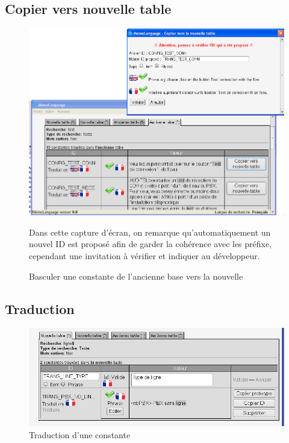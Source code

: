         \subsection{Copier vers nouvelle table}
    \begin{figure}[H]
        \centering
        \includegraphics[width=16cm]{images/2-activite/copierVersNouvelleTable.jpg} \caption{Basculer une constante de l'ancienne base vers la nouvelle}
        \label{copierVersNouvelleTable}
        Dans cette capture d'écran, on remarque qu'automatiquement un nouvel ID est proposé afin de garder la cohérence avec les préfixe, cependant une invitation à vérifier et indiquer au développeur.
    \end{figure}

    \subsection{Traduction}
    \label{traduction}
    \begin{figure}[H]
        \centering
        \includegraphics[width=16cm]{images/2-activite/traduction.jpg}
        \caption{Traduction d'une constante}
    \end{figure}

